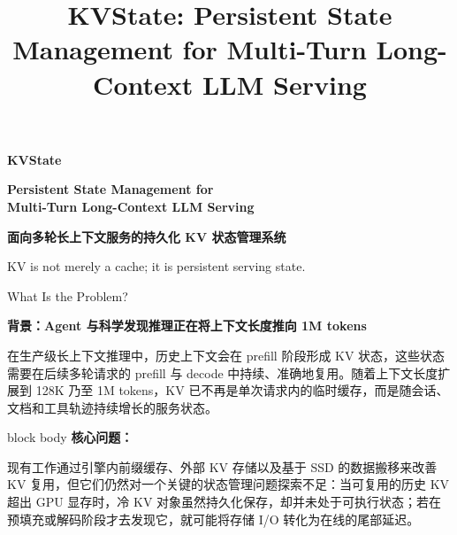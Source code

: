 \documentclass[aspectratio=169,10pt]{beamer}
\title{KVState: Persistent State Management for Multi-Turn Long-Context LLM Serving}
\author{}
\date{}
\begin{document}
\begin{frame}[plain]
\centering
\vspace{2.2em}

{\fontsize{26pt}{31pt}\selectfont\textbf{\textcolor{MainBlue}{KVState}}}

\vspace{0.9em}

{\Large\textbf{Persistent State Management for\\ Multi-Turn Long-Context LLM Serving}}

\vspace{1.5em}

{\large\textbf{面向多轮长上下文服务的持久化 KV 状态管理系统}}

\vfill

{\small KV is not merely a cache; it is persistent serving state.}

\end{frame}

\begin{frame}[t]{What Is the Problem?}
\small
\vspace{-0.5em}

\textbf{\textcolor{MainBlue}{背景：Agent 与科学发现推理正在将上下文长度推向 1M tokens}}

\vspace{0.2em}
在生产级长上下文推理中，历史上下文会在 prefill 阶段形成 KV 状态，这些状态需要在后续多轮请求的 prefill 与 decode 中持续、准确地复用。随着上下文长度扩展到 128K 乃至 1M tokens，KV 已不再是单次请求内的临时缓存，而是随会话、文档和工具轨迹持续增长的服务状态。

\vspace{0.8em}

\begin{beamercolorbox}[wd=\linewidth,sep=0.7em,rounded=true]{block body}
\textbf{\textcolor{AccentRed}{核心问题：}}

现有工作通过引擎内前缀缓存、外部 KV 存储以及基于 SSD 的数据搬移来改善 KV 复用，但它们仍然对一个关键的状态管理问题探索不足：当可复用的历史 KV 超出 GPU 显存时，冷 KV 对象虽然持久化保存，却并未处于可执行状态；若在预填充或解码阶段才去发现它，就可能将存储 I/O 转化为在线的尾部延迟。
\end{beamercolorbox}

\end{frame}
\end{document}
